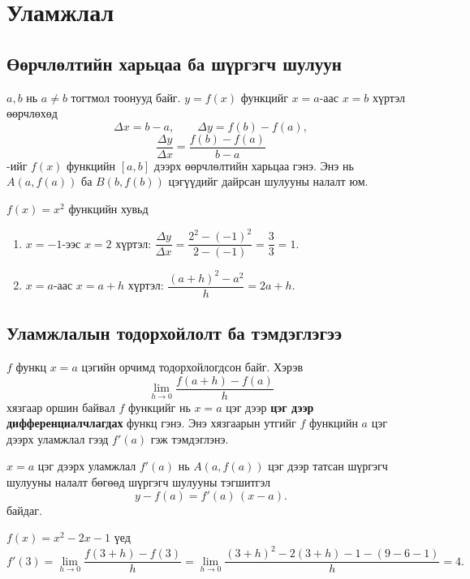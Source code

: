 \chapter{Уламжлал}

\section{Өөрчлөлтийн харьцаа ба шүргэгч шулуун}

\begin{definition}
$a,b$ нь $a\ne b$ тогтмол тоонууд байг. $y=f(x)$ функцийг $x=a$-аас $x=b$ хүртэл өөрчлөхөд
\[
\Delta x=b-a,\qquad \Delta y=f(b)-f(a),
\]
\[
\frac{\Delta y}{\Delta x}=\frac{f(b)-f(a)}{b-a}
\]
-ийг $f(x)$ функцийн $[a,b]$ дээрх өөрчлөлтийн харьцаа гэнэ. Энэ нь $A(a,f(a))$ ба $B(b,f(b))$ цэгүүдийг дайрсан шулууны налалт юм.
\end{definition}

\begin{example}
$f(x)=x^2$ функцийн хувьд
\begin{enumerate}
  \item $x=-1$-ээс $x=2$ хүртэл: $\dfrac{\Delta y}{\Delta x}=\dfrac{2^2-(-1)^2}{2-(-1)}=\dfrac{3}{3}=1$.
  \item $x=a$-аас $x=a+h$ хүртэл: $\dfrac{(a+h)^2-a^2}{h}=2a+h$.
\end{enumerate}
\end{example}
\section{Уламжлалын тодорхойлолт ба тэмдэглэгээ}

\begin{definition}
$f$ функц $x=a$ цэгийн орчимд тодорхойлогдсон байг. Хэрэв
\[
\lim_{h\to 0}\frac{f(a+h)-f(a)}{h}
\]
хязгаар оршин байвал $f$ функцийг нь $x=a$ цэг дээр \textbf{цэг дээр дифференциалчлагдах} функц гэнэ. Энэ хязгаарын утгийг $f$ функцийн $a$ цэг дээрх уламжлал гээд $f'(a)$ гэж тэмдэглэнэ.
\end{definition}

\begin{note}
$x=a$ цэг дээрх уламжлал $f'(a)$ нь $A(a,f(a))$ цэг дээр татсан шүргэгч шулууны налалт бөгөөд шүргэгч шулууны тэгшитгэл
\[
y - f(a) = f'(a)\,(x-a).
\] байдаг.
\end{note}

\begin{example}
$f(x)=x^2-2x-1$ үед
\[
f'(3)=\lim_{h\to 0}\frac{f(3+h)-f(3)}{h}
=\lim_{h\to 0}\frac{(3+h)^2-2(3+h)-1 - (9-6-1)}{h}=4.
\]
\end{example}

